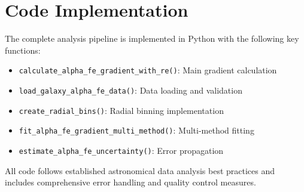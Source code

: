 \documentclass[11pt,a4paper]{article}
\begin{document}
\section{Code Implementation}

The complete analysis pipeline is implemented in Python with the following key functions:

\begin{itemize}
\item \texttt{calculate\_alpha\_fe\_gradient\_with\_re()}: Main gradient calculation
\item \texttt{load\_galaxy\_alpha\_fe\_data()}: Data loading and validation
\item \texttt{create\_radial\_bins()}: Radial binning implementation
\item \texttt{fit\_alpha\_fe\_gradient\_multi\_method()}: Multi-method fitting
\item \texttt{estimate\_alpha\_fe\_uncertainty()}: Error propagation
\end{itemize}

All code follows established astronomical data analysis best practices and includes comprehensive error handling and quality control measures.



\end{document}
